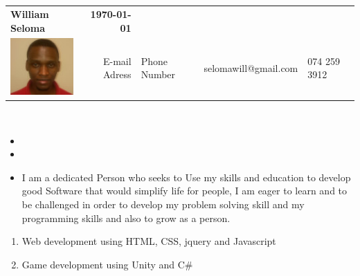 %
\\ \\

\begin{tabular*}{6.5in}{l@{\extracolsep{\fill}}r}
\textbf{\Large } \textbf{William Seloma} & \textbf{\today} \\
\includegraphics{./images/william889} & E-mail
Adress & Phone Number & {\color{green}selomawill@gmail.com} & {\color{green}074 259 3912}
\end{tabular*}
\\

\begin{itemize}

\item {}

\item {}

\end{itemize}


\begin{itemize}
 \item %
 I am a dedicated Person who seeks to Use my skills and education to develop good Software that would simplify life for people, I am eager to learn and to be challenged in order to develop my problem solving skill and my programming skills and also to grow as a person.
\end{itemize}



\begin{enumerate}
 \item Web development using HTML, CSS, jquery and Javascript 
 \item Game development using Unity and C#
\end{enumerate}

